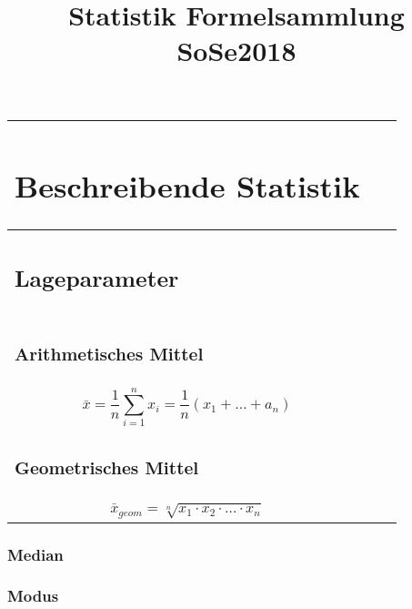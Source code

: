 \documentclass[a4paper, 12pt, landscape]{article}
\title{Statistik Formelsammlung SoSe2018}
\begin{document}
\begin{tabular}{|p{8cm}|p{8cm}|p{8cm}|}
\hline
\section{Beschreibende Statistik} \\
\hline
\subsection{Lageparameter} \\
\hline
\subsubsection{Arithmetisches Mittel} \\
\[\bar{x}=\frac{1}{n}\sum \limits_{i=1}^n x_i=\frac{1}{n}(x_1 + \dots + a_n)\] \\
\hline
\subsubsection{Geometrisches Mittel} \\

\[\bar{x}_{geom} = \sqrt[n]{x_1 \cdot x_2 \cdot \dots \cdot x_n}\] \\
\hline
\end{tabular}

\subsubsection{Median}

\subsubsection{Modus}

\paragraph{}
\subparagraph{}
\end{document}
